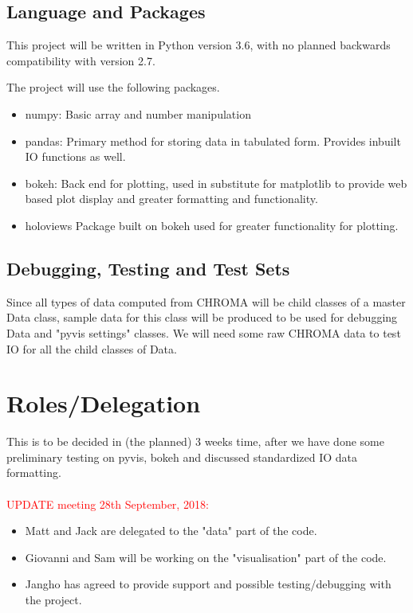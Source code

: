 \documentclass[letterpaper,11pt]{article}
\begin{document}
\subsection{Language and Packages \label{sec:pack}}
This project will be written in Python version 3.6, with no planned backwards compatibility with version 2.7.

The project will use the following packages.
\begin{itemize}
  \item numpy:    Basic array and number manipulation
  \item pandas:   Primary method for storing data in tabulated form. Provides inbuilt IO functions as well.
  \item bokeh:    Back end for plotting, used in substitute for matplotlib to provide web based plot display and greater formatting and functionality.
  \item holoviews     Package built on bokeh used for greater functionality for plotting.
\end{itemize}

\subsection{Debugging, Testing and Test Sets}
Since all types of data computed from CHROMA will be child classes of a master Data class, sample data
for this class will be produced to be used for debugging Data and "pyvis settings" classes.
We will need some raw CHROMA data to test IO for all the child classes of Data.

\section{Roles/Delegation}
This is to be decided in (the planned) 3 weeks time, after we have done some preliminary testing on pyvis, bokeh and discussed standardized
IO data formatting.
\\ \hline \\
\vspace*{0.5cm}
\textcolor{red}{UPDATE meeting 28th September, 2018:}
\begin{itemize}
  \item Matt and Jack are delegated to the "data" part of the code.
  \item Giovanni and Sam will be working on the "visualisation" part of the code.
  \item Jangho has agreed to provide support and possible testing/debugging with the project.
\end{itemize}
\\ \hline \\
\vspace*{0.5cm}
\end{document}
